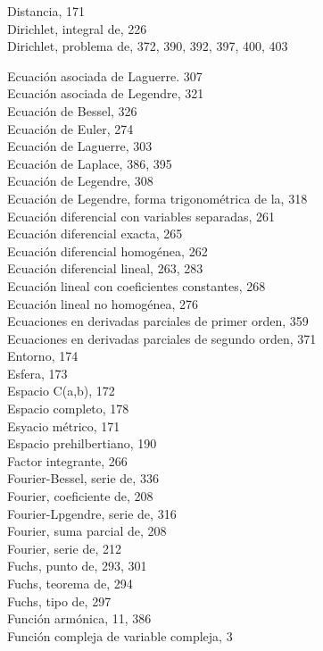 \documentclass[10pt]{article}
\theoremstyle{plain}
\theoremstyle{definition}
\theoremstyle{remark}
\begin{document}
Distancia, 171\\
Dirichlet, integral de, 226\\
Dirichlet, problema de, 372, 390, 392, 397, 400, 403

Ecuación asociada de Laguerre. 307\\
Ecuación asociada de Legendre, 321\\
Ecuación de Bessel, 326\\
Ecuación de Euler, 274\\
Ecuación de Laguerre, 303\\
Ecuación de Laplace, 386, 395\\
Ecuación de Legendre, 308\\
Ecuación de Legendre, forma trigonométrica de la, 318\\
Ecuación diferencial con variables separadas, 261\\
Ecuación diferencial exacta, 265\\
Ecuación diferencial homogénea, 262\\
Ecuación diferencial lineal, 263, 283\\
Ecuación lineal con coeficientes constantes, 268\\
Ecuación lineal no homogénea, 276\\
Ecuaciones en derivadas parciales de primer orden, 359\\
Ecuaciones en derivadas parciales de segundo orden, 371\\
Entorno, 174\\
Esfera, 173\\
Espacio C(a,b), 172\\
Espacio completo, 178\\
Esyacio métrico, 171\\
Espacio prehilbertiano, 190\\
Factor integrante, 266\\
Fourier-Bessel, serie de, 336\\
Fourier, coeficiente de, 208\\
Fourier-Lpgendre, serie de, 316\\
Fourier, suma parcial de, 208\\
Fourier, serie de, 212\\
Fuchs, punto de, 293, 301\\
Fuchs, teorema de, 294\\
Fuchs, tipo de, 297\\
Función armónica, 11, 386\\
Función compleja de variable compleja, 3
\end{document}
